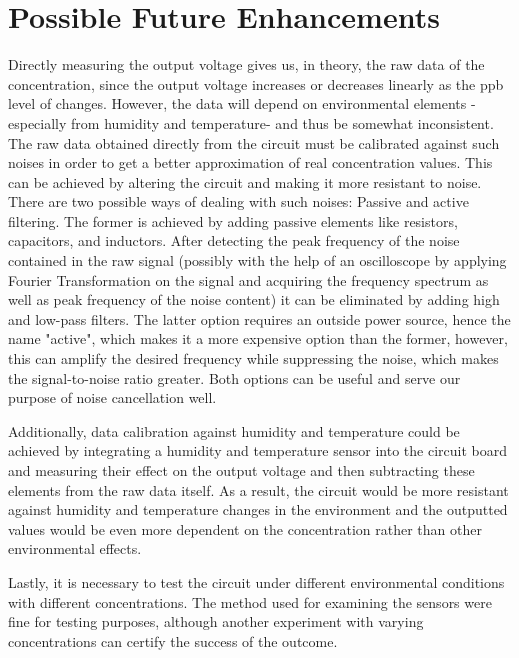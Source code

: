 \section{Possible Future Enhancements}
Directly measuring the output voltage gives us, in theory, the raw data of the  concentration, since the output voltage increases or decreases linearly as the ppb level of  changes. However, the data will depend on environmental elements -especially from humidity and temperature- and thus be somewhat inconsistent. The raw data obtained directly from the circuit must be calibrated against such noises in order to get a better approximation of real concentration values. This can be achieved by altering the circuit and making it more resistant to noise. There are two possible ways of dealing with such noises: Passive and active filtering. The former is achieved by adding passive elements like resistors, capacitors, and inductors. After detecting the peak frequency of the noise contained in the raw signal (possibly with the help of an oscilloscope by applying Fourier Transformation on the signal and acquiring the frequency spectrum as well as peak frequency of the noise content) it can be eliminated by adding high and low-pass filters. The latter option requires an outside power source, hence the name "active", which makes it a more expensive option than the former, however, this can amplify the desired frequency while suppressing the noise, which makes the signal-to-noise ratio greater. Both options can be useful and serve our purpose of noise cancellation well.\par 
Additionally, data calibration against humidity and temperature could be achieved by integrating a humidity and temperature sensor into the circuit board and measuring their effect on the output voltage and then subtracting these elements from the raw data itself. As a result, the circuit would be more resistant against humidity and temperature changes in the environment and the outputted values would be even more dependent on the  concentration rather than other environmental effects.\par
Lastly, it is necessary to test the circuit under different environmental conditions with different  concentrations. The method used for examining the sensors were fine for testing purposes, although another experiment with varying  concentrations can certify the success of the outcome.



